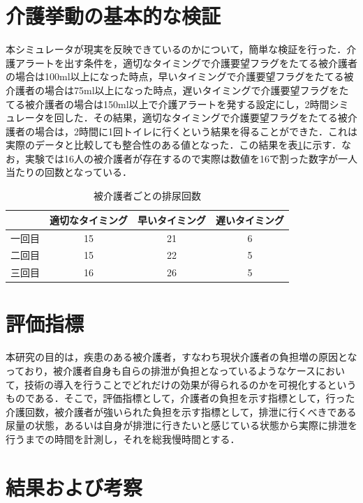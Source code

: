 \section{介護挙動の基本的な検証}

本シミュレータが現実を反映できているのかについて，簡単な検証を行った．介護アラートを出す条件を，適切なタイミングで介護要望フラグをたてる被介護者の場合は100ml以上になった時点，早いタイミングで介護要望フラグをたてる被介護者の場合は75ml以上になった時点，遅いタイミングで介護要望フラグをたてる被介護者の場合は150ml以上で介護アラートを発する設定にし，2時間シミュレータを回した．その結果，適切なタイミングで介護要望フラグをたてる被介護者の場合は，2時間に1回トイレに行くという結果を得ることができた．これは実際のデータと比較しても整合性のある値となった．この結果を表\ref{number_of_urination}に示す．なお，実験では16人の被介護者が存在するので実際は数値を16で割った数字が一人当たりの回数となっている．

\begin{table}[htb]
  \caption[被介護者ごとの排尿回数]{被介護者ごとの排尿回数}
  \label{number_of_urination}
  \centering
  \begin{tabular}{r|c|c|c}
     & 適切なタイミング & 早いタイミング & 遅いタイミング \\ \hline
    一回目 & 15 & 21 & 6 \\
    二回目 & 15 & 22 & 5 \\
    三回目 & 16 & 26 & 5 \\
  \end{tabular}
\end{table}

\section{評価指標}

本研究の目的は，疾患のある被介護者，すなわち現状介護者の負担増の原因となっており，被介護者自身も自らの排泄が負担となっているようなケースにおいて，技術の導入を行うことでどれだけの効果が得られるのかを可視化するというものである．そこで，評価指標として，介護者の負担を示す指標として，行った介護回数，被介護者が強いられた負担を示す指標として，排泄に行くべきである尿量の状態，あるいは自身が排泄に行きたいと感じている状態から実際に排泄を行うまでの時間を計測し，それを総我慢時間とする．

\section{結果および考察}

